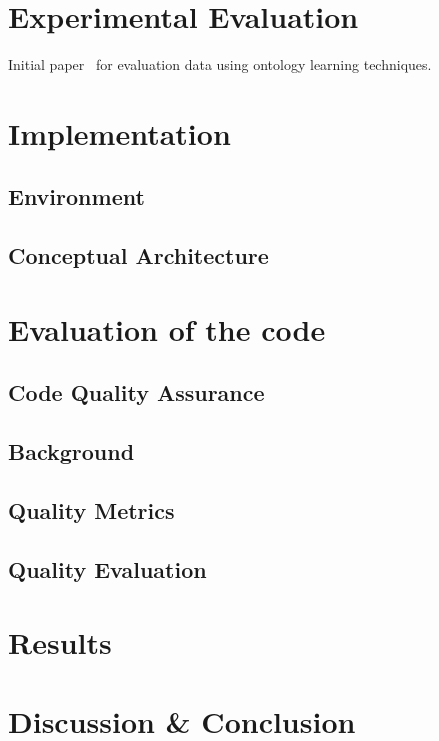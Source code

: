 \documentclass[draft,final]{vutinfth} %
\begin{document}
\chapter{Experimental Evaluation}
Initial paper~\cite{liu2005semi} for evaluation data using ontology learning techniques.


\chapter{Implementation}\label{chap:implementation}
\section{Environment}
\section{Conceptual Architecture}




\chapter{Evaluation of the code}
\section{Code Quality Assurance}
\section{Background}
\section{Quality Metrics}
\section{Quality Evaluation}



\chapter{Results}



\chapter{Discussion \& Conclusion}
\end{document}

